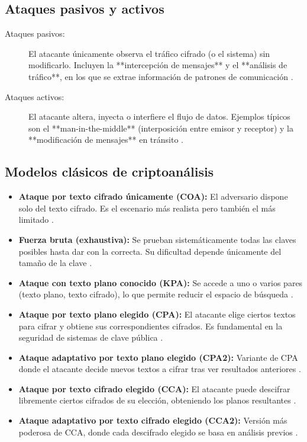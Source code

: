 \subsection{Ataques pasivos y activos}

\begin{description}
  \item[Ataques pasivos:] El atacante únicamente observa el tráfico cifrado (o el sistema) sin modificarlo. Incluyen la **intercepción de mensajes** y el **análisis de tráfico**, en los que se extrae información de patrones de comunicación \cite{turn1search7}\cite{turn1search8}.
  \item[Ataques activos:] El atacante altera, inyecta o interfiere el flujo de datos. Ejemplos típicos son el **man-in-the-middle** (interposición entre emisor y receptor) y la **modificación de mensajes** en tránsito \cite{turn1search4}.
\end{description}

\subsection{Modelos clásicos de criptoanálisis}

\begin{itemize}
  \item \textbf{Ataque por texto cifrado únicamente (COA):} El adversario dispone solo del texto cifrado. Es el escenario más realista pero también el más limitado \cite{turn1search3}.
  \item \textbf{Fuerza bruta (exhaustiva):} Se prueban sistemáticamente todas las claves posibles hasta dar con la correcta. Su dificultad depende únicamente del tamaño de la clave \cite{turn1search0}\cite{turn1search1}.
  \item \textbf{Ataque con texto plano conocido (KPA):} Se accede a uno o varios pares (texto plano, texto cifrado), lo que permite reducir el espacio de búsqueda \cite{turn1search3}.
  \item \textbf{Ataque por texto plano elegido (CPA):} El atacante elige ciertos textos para cifrar y obtiene sus correspondientes cifrados. Es fundamental en la seguridad de sistemas de clave pública \cite{turn1search3}.
  \item \textbf{Ataque adaptativo por texto plano elegido (CPA2):} Variante de CPA donde el atacante decide nuevos textos a cifrar tras ver resultados anteriores \cite{turn1search3}.
  \item \textbf{Ataque por texto cifrado elegido (CCA):} El atacante puede descifrar libremente ciertos cifrados de su elección, obteniendo los planos resultantes \cite{turn1search3}.
  \item \textbf{Ataque adaptativo por texto cifrado elegido (CCA2):} Versión más poderosa de CCA, donde cada descifrado elegido se basa en análisis previos \cite{turn1search3}.
\end{itemize}

